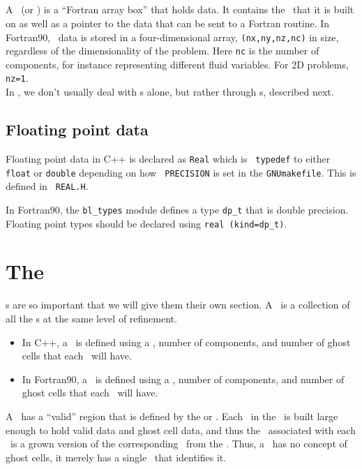 \subsection{\FArrayBox}

A \FArrayBox\ (or \Fab) is a ``Fortran array box'' that holds data.  It contains the
\BoxType\ that it is built on as well as a pointer to the data 
that can be sent to a Fortran routine.
In Fortran90, \Fab\ data is stored in a four-dimensional array,
{\tt (nx,ny,nz,nc)} in size, regardless of the dimensionality of the
problem.  Here {\tt nc} is the number of components, for instance
representing different fluid variables.  For 2D problems, {\tt nz=1}.\\

In \BoxLib, we don't usually deal with 
\Fab s alone, but rather through \MultiFab s, described next.

\subsection{Floating point data}

Floating point data in C++ is declared as {\tt Real} which is {\tt
typedef} to either {\tt float} or {\tt double} depending on how {\tt
PRECISION} is set in the {\tt GNUmakefile}.  This is defined in {\tt
REAL.H}.

In Fortran90, the {\tt bl\_types} module defines a type {\tt dp\_t} that
is double precision.  Floating point types should be declared using
{\tt real (kind=dp\_t)}.


\section{The \MultiFab}
\MultiFab s are so important that we will give them their own section.
A \MultiFab\ is a collection of all the \Fab s at the same level of
refinement.
\begin{itemize}
\item In C++, a \MultiFab\ is defined using a \BoxArray,
number of components, and number of ghost cells that each \Fab\
will have.
\item In Fortran90, a \MultiFab\ is defined using a \layout,
number of components, and number of ghost cells that each \Fab\
will have.
\end{itemize}
A \MultiFab\ has a ``valid'' region that is defined by 
the \BoxArray or \layout.  Each \Fab\ in the \MultiFab\ is built large enough 
to hold valid data and ghost cell data, and thus the \BoxType\ associated with
each \Fab\ is a grown version of the corresponding \BoxType\ from the \BoxArray.
Thus, a \Fab\ has no concept 
of ghost cells, it merely has a single \BoxType\ that identifies it.\\

